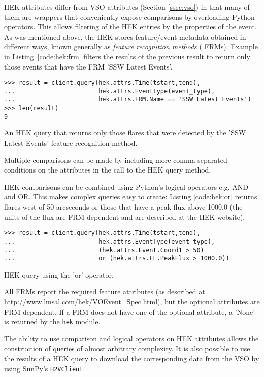 HEK attributes differ from VSO attributes (Section \ref{ssec:vso}) in that many 
of them are wrappers that conveniently expose comparisons by overloading Python 
operators.  This allows filtering of the HEK entries by the properties of the 
event.  As was mentioned above, the HEK stores feature/event metadata obtained 
in different ways, known generally as {\it feature recognition methods} ( 
FRMs). Example in Listing~\ref{code:hek:frm} filters the results of the previous result to 
return only those events that have the FRM 'SSW Latest Events'.
\begin{listing}[H]
\begin{verbatim}
>>> result = client.query(hek.attrs.Time(tstart,tend), 
...                       hek.attrs.EventType(event_type),
...                       hek.attrs.FRM.Name == 'SSW Latest Events')
>>> len(result)
9
\end{verbatim}
\caption{An HEK query that returns only those flares that were
  detected by the 'SSW Latest Events' feature recognition method.}
\label{code:hek:frm}
\end{listing}
Multiple comparisons can be made by including more comma-separated
conditions on the attributes in the call to the HEK query method.

HEK comparisons can be combined using Python’s logical operators e.g. AND
and OR. This makes complex queries easy to create: Listing \ref{code:hek:or} 
returns flares west of 50 arcseconds or those that have a peak flux above 
1000.0 (the units of the flux are FRM dependent and are described at the HEK 
website).
\begin{listing}[H]
\begin{verbatim}
>>> result = client.query(hek.attrs.Time(tstart,tend), 
...                       hek.attrs.EventType(event_type),
...                       (hek.attrs.Event.Coord1 > 50) 
...                       or (hek.attrs.FL.PeakFlux > 1000.0))
\end{verbatim}
\caption{HEK query using the 'or' operator.}
\label{code:hek:or}
\end{listing}
All FRMs report the required feature attributes (as described at 
\url{http://www.lmsal.com/hek/VOEvent_Spec.html}), but the optional attributes 
are FRM dependent.  If a FRM does not have one of the optional attribute, a 
'None' is returned by the \texttt{hek} module. 

The ability to use comparison and logical operators on HEK attributes allows 
the construction of queries of almost arbitrary complexity. 
It is also possible to use the 
results of a HEK query to download the corresponding data from the VSO by using 
SunPy's \texttt{H2VClient}.
